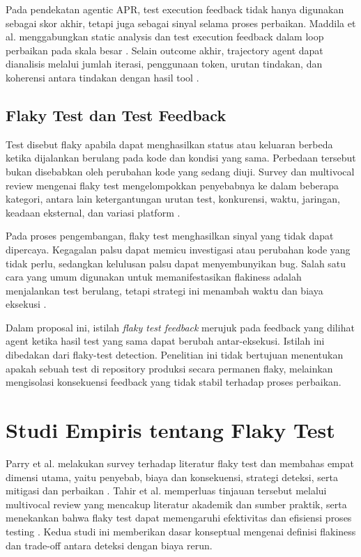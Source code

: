 Pada pendekatan agentic APR, test execution feedback tidak hanya digunakan sebagai skor akhir, tetapi juga sebagai sinyal selama proses perbaikan. Maddila et al. menggabungkan static analysis dan test execution feedback dalam loop perbaikan pada skala besar \cite{maddila2026}. Selain outcome akhir, trajectory agent dapat dianalisis melalui jumlah iterasi, penggunaan token, urutan tindakan, dan koherensi antara tindakan dengan hasil tool \cite{bouzenia2025trajectories}.

\subsection{Flaky Test dan Test Feedback}

Test disebut flaky apabila dapat menghasilkan status atau keluaran berbeda ketika dijalankan berulang pada kode dan kondisi yang sama. Perbedaan tersebut bukan disebabkan oleh perubahan kode yang sedang diuji. Survey dan multivocal review mengenai flaky test mengelompokkan penyebabnya ke dalam beberapa kategori, antara lain ketergantungan urutan test, konkurensi, waktu, jaringan, keadaan eksternal, dan variasi platform \cite{parry2022flaky,tahir2023flakiness}.

Pada proses pengembangan, flaky test menghasilkan sinyal yang tidak dapat dipercaya. Kegagalan palsu dapat memicu investigasi atau perubahan kode yang tidak perlu, sedangkan kelulusan palsu dapat menyembunyikan bug. Salah satu cara yang umum digunakan untuk memanifestasikan flakiness adalah menjalankan test berulang, tetapi strategi ini menambah waktu dan biaya eksekusi \cite{parry2022flaky,tahir2023flakiness}.

Dalam proposal ini, istilah \textit{flaky test feedback} merujuk pada feedback yang dilihat agent ketika hasil test yang sama dapat berubah antar-eksekusi. Istilah ini dibedakan dari flaky-test detection. Penelitian ini tidak bertujuan menentukan apakah sebuah test di repository produksi secara permanen flaky, melainkan mengisolasi konsekuensi feedback yang tidak stabil terhadap proses perbaikan.

\section{Studi Empiris tentang Flaky Test}

Parry et al. melakukan survey terhadap literatur flaky test dan membahas empat dimensi utama, yaitu penyebab, biaya dan konsekuensi, strategi deteksi, serta mitigasi dan perbaikan \cite{parry2022flaky}. Tahir et al. memperluas tinjauan tersebut melalui multivocal review yang mencakup literatur akademik dan sumber praktik, serta menekankan bahwa flaky test dapat memengaruhi efektivitas dan efisiensi proses testing \cite{tahir2023flakiness}. Kedua studi ini memberikan dasar konseptual mengenai definisi flakiness dan trade-off antara deteksi dengan biaya rerun.

